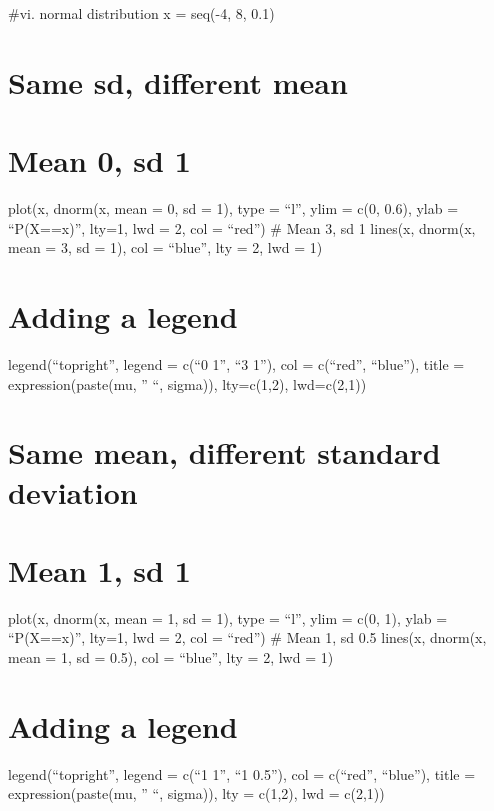 \documentclass[
]{article}
\begin{document}
\#vi. normal distribution x = seq(-4, 8, 0.1)

\hypertarget{same-sd-different-mean}{%
\section{Same sd, different mean}\label{same-sd-different-mean}}

\hypertarget{mean-0-sd-1}{%
\section{Mean 0, sd 1}\label{mean-0-sd-1}}

plot(x, dnorm(x, mean = 0, sd = 1), type = ``l'', ylim = c(0, 0.6), ylab
= ``P(X==x)'', lty=1, lwd = 2, col = ``red'') \# Mean 3, sd 1 lines(x,
dnorm(x, mean = 3, sd = 1), col = ``blue'', lty = 2, lwd = 1)

\hypertarget{adding-a-legend-1}{%
\section{Adding a legend}\label{adding-a-legend-1}}

legend(``topright'', legend = c(``0 1'', ``3 1''), col = c(``red'',
``blue''), title = expression(paste(mu, '' ``, sigma)), lty=c(1,2),
lwd=c(2,1))

\hypertarget{same-mean-different-standard-deviation}{%
\section{Same mean, different standard
deviation}\label{same-mean-different-standard-deviation}}

\hypertarget{mean-1-sd-1-1}{%
\section{Mean 1, sd 1}\label{mean-1-sd-1-1}}

plot(x, dnorm(x, mean = 1, sd = 1), type = ``l'', ylim = c(0, 1), ylab =
``P(X==x)'', lty=1, lwd = 2, col = ``red'') \# Mean 1, sd 0.5 lines(x,
dnorm(x, mean = 1, sd = 0.5), col = ``blue'', lty = 2, lwd = 1)

\hypertarget{adding-a-legend-2}{%
\section{Adding a legend}\label{adding-a-legend-2}}

legend(``topright'', legend = c(``1 1'', ``1 0.5''), col = c(``red'',
``blue''), title = expression(paste(mu, '' ``, sigma)), lty = c(1,2),
lwd = c(2,1))
\end{document}
